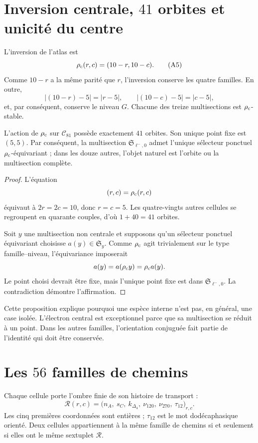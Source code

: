 \section{Inversion centrale, \(41\) orbites et unicité du centre}

L'inversion de l'atlas est
\[
 \rho_{\rm c}(r,c)=(10-r,10-c).
 \tag{A5}\label{eq:inversion-central-atlas-rev6}
\]
Comme \(10-r\) a la même parité que \(r\), l'inversion conserve les
quatre familles. En outre,
\[
 |(10-r)-5|=|r-5|,
 \qquad
 |(10-c)-5|=|c-5|,
\]
et, par conséquent, conserve le niveau \(G\). Chacune des treize
multisections est \(\rho_{\rm c}\)-stable.

\begin{proposition}
\label{prop:orbitas-centro-atlas-rev6}
L'action de \(\rho_{\rm c}\) sur \(\mathcal C_{81}\) possède exactement
\(41\) orbites. Son unique point fixe est \((5,5)\). Par conséquent, la
multisection \(\mathfrak S_{\ell^-,0}\) admet l'unique sélecteur ponctuel
\(\rho_{\rm c}\)-équivariant ; dans les douze autres, l'objet naturel est
l'orbite ou la multisection complète.
\end{proposition}

\begin{proof}
L'équation
\[
 (r,c)=\rho_{\rm c}(r,c)
\]
équivaut à \(2r=2c=10\), donc \(r=c=5\). Les quatre-vingts autres cellules se
regroupent en quarante couples, d'où \(1+40=41\) orbites.

Soit \(y\) une multisection non centrale et supposons qu'un sélecteur ponctuel
équivariant choisisse \(a(y)\in\mathfrak S_y\). Comme \(\rho_{\rm c}\) agit
trivialement sur le type famille--niveau, l'équivariance imposerait
\[
 a(y)=a(\rho_{\rm c}y)=\rho_{\rm c}a(y).
\]
Le point choisi devrait être fixe, mais l'unique point fixe est dans
\(\mathfrak S_{\ell^-,0}\). La contradiction démontre l'affirmation.
\end{proof}

Cette proposition explique pourquoi une espèce interne n'est pas, en général, une
case isolée. L'électron central est exceptionnel parce que sa multisection
se réduit à un point. Dans les autres familles, l'orientation conjuguée fait
partie de l'identité qui doit être conservée.

\section{Les \(56\) familles de chemins}

Chaque cellule porte l'ombre finie de son histoire de transport :
\[
 \mathcal R(r,c)=
 \bigl(
 n_A,\ s_C,\ k_{\Delta_4},\
 \nu_{120},\ \nu_{270},\ \tau_{12}
 \bigr)_{r,c}.
 \tag{A6}\label{eq:lector-familia-ruta-atlas}
\]
Les cinq premières coordonnées sont entières ; \(\tau_{12}\) est le mot
dodécaphasique orienté. Deux cellules appartiennent à la même famille de chemins
si et seulement si elles ont le même sextuplet \(\mathcal R\).

